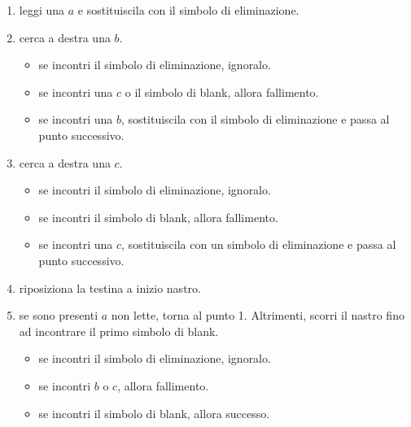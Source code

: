 \begin{enumerate}
    \item leggi una $a$ e sostituiscila con il simbolo di eliminazione.
    \item cerca a destra una $b$.
    \begin{itemize}
        \item se incontri il simbolo di eliminazione, ignoralo.
        \item se incontri una $c$ o il simbolo di blank, allora fallimento.
        \item se incontri una $b$, sostituiscila con il simbolo di eliminazione
        e passa al punto successivo.
    \end{itemize}
    \item cerca a destra una $c$.
    \begin{itemize}
        \item se incontri il simbolo di eliminazione, ignoralo.
        \item se incontri il simbolo di blank, allora fallimento.
        \item se incontri una $c$, sostituiscila con un simbolo di eliminazione
        e passa al punto successivo.
    \end{itemize}
    \item riposiziona la testina a inizio nastro.
    \item se sono presenti $a$ non lette, torna al punto 1.
    Altrimenti, scorri il nastro fino ad incontrare il primo simbolo di blank.
    \begin{itemize}
        \item se incontri il simbolo di eliminazione, ignoralo.
        \item se incontri $b$ o $c$, allora fallimento.
        \item se incontri il simbolo di blank, allora successo.
    \end{itemize}
\end{enumerate}


